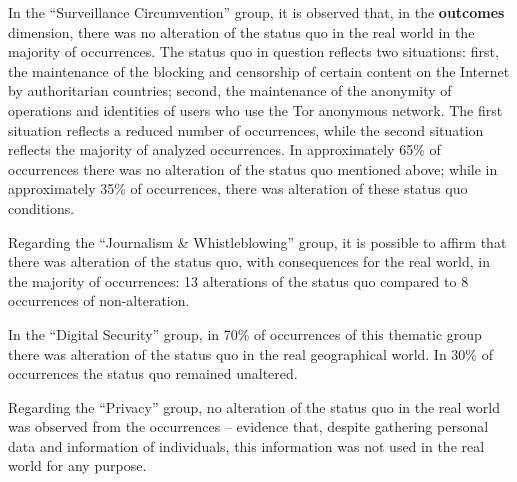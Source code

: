 In the ``Surveillance Circumvention'' group, it is observed that, in the \textbf{outcomes} dimension, there was no alteration of the status quo in the real world in the majority of occurrences. The status quo in question reflects two situations: first, the maintenance of the blocking and censorship of certain content on the Internet by authoritarian countries; second, the maintenance of the anonymity of operations and identities of users who use the Tor anonymous network. The first situation reflects a reduced number of occurrences, while the second situation reflects the majority of analyzed occurrences. In approximately 65\% of occurrences there was no alteration of the status quo mentioned above; while in approximately 35\% of occurrences, there was alteration of these status quo conditions.

Regarding the ``Journalism \& Whistleblowing'' group, it is possible to affirm that there was alteration of the status quo, with consequences for the real world, in the majority of occurrences: 13 alterations of the status quo compared to 8 occurrences of non-alteration.

In the ``Digital Security'' group, in 70\% of occurrences of this thematic group there was alteration of the status quo in the real geographical world. In 30\% of occurrences the status quo remained unaltered.

Regarding the ``Privacy'' group, no alteration of the status quo in the real world was observed from the occurrences -- evidence that, despite gathering personal data and information of individuals, this information was not used in the real world for any purpose.


